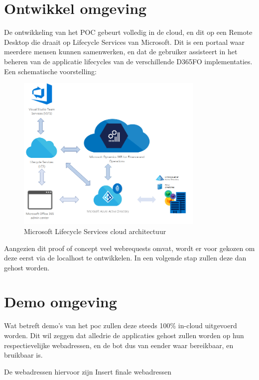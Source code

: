 \section{Ontwikkel omgeving}
De ontwikkeling van het POC gebeurt volledig in de cloud, en dit op een Remote Desktop die draait op Lifecycle Services van Microsoft. Dit is een portaal waar meerdere mensen kunnen samenwerken, en dat de gebruiker assisteert in het beheren van de applicatie lifecycles van de verschillende D365FO implementaties.
Een schematische voorstelling:

\begin{figure}[H]
    \centering
    \includegraphics[width=0.8\textwidth]{img/lcsCloudArchitecture.png}
    \caption{Microsoft Lifecycle Services cloud architectuur}
\end{figure}

Aangezien dit proof of concept veel webrequests omvat, wordt er voor gekozen om deze eerst via de localhost te ontwikkelen. In een volgende stap zullen deze dan gehost worden. 

\section{Demo omgeving}
Wat betreft demo's van het poc zullen deze steeds 100\% in-cloud uitgevoerd worden. Dit wil zeggen dat alledrie de applicaties gehost zullen worden op hun respectievelijke webadressen, en de bot dus van eender waar bereikbaar, en bruikbaar is. 

De webadressen hiervoor zijn 
Insert finale webadressen

